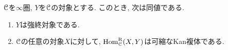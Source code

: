 \documentclass[uplatex, a4paper, 14Q, dvipdfmx]{jsreport}
\begin{document}


\begin{proposition}  \label{prop.1.2.12.4}
  $\mathcal{C}$を$\infty$圏, $Y$を$\mathcal{C}$の対象とする. 
  このとき, 次は同値である. 
  \begin{enumerate}
    \item $Y$は強終対象である. 
    \item $\mathcal{C}$の任意の対象$X$に対して, $\mathrm{Hom}^{\mathrm{R}}_{\mathcal{C}}(X,Y)$は可縮なKan複体である.
  \end{enumerate}
\end{proposition}
\end{document}
